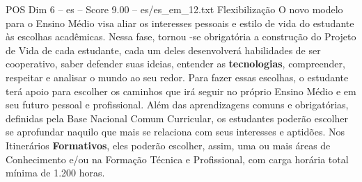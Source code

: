 \begin{textsample}{POS Dim 6 – es – Score 9.00 – es/es\_em\_12.txt}  \label{ex:f6_pos_144}
Flexibilização O novo modelo para o Ensino Médio visa aliar os interesses pessoais e estilo de vida do estudante às escolhas acadêmicas.
Nessa fase, tornou -se obrigatória a construção do Projeto de Vida de cada estudante, cada um deles desenvolverá habilidades de ser cooperativo, saber defender suas ideias, entender as \textbf{tecnologias}, compreender, respeitar e analisar o mundo ao seu redor.
Para fazer essas escolhas, o estudante terá apoio para escolher os caminhos que irá seguir no próprio Ensino Médio e em seu futuro pessoal e profissional.
Além das aprendizagens comuns e obrigatórias, definidas pela Base Nacional Comum Curricular, os estudantes poderão escolher se aprofundar naquilo que mais se relaciona com seus interesses e aptidões.
Nos Itinerários \textbf{Formativos}, eles poderão escolher, assim, uma ou mais áreas de Conhecimento e/ou na Formação Técnica e Profissional, com carga horária total mínima de 1.200 horas.

\end{textsample}
